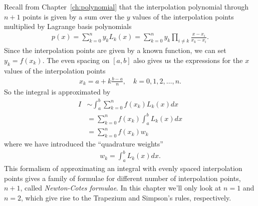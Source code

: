 Recall from Chapter~\ref{ch:polynomial} that the interpolation polynomial through $n+1$ points is given by a sum over the $y$ values of the interpolation points multiplied by Lagrange basis polynomials
\begin{align*}
p(x)  = \sum_{k=0}^n y_k L_k(x) = \sum_{k=0}^n y_k \prod_{i\neq k} \frac{x-x_i}{x_k-x_i}.
\end{align*}
Since the interpolation points are given by a known function, we can set $y_k=f(x_k)$. The even spacing on $[a,b]$ also gives us the expressions for the $x$ values of the interpolation points
\begin{align*}
x_k = a + k\frac{b-a}{n}, \quad k=0,1,2,\dots,n.
\end{align*}
So the integral is approximated by
\begin{align*}
I &\sim \int_a^b \sum_{k=0}^n f(x_k) L_k(x) dx \\
&=  \sum_{k=0}^n f(x_k) \int_a^b L_k(x) dx \\
&=  \sum_{k=0}^n f(x_k) w_k
\end{align*}
where we have introduced the ``quadrature weights''
\begin{align*}
w_k = \int_a^b L_k(x) dx.
\end{align*}
This formalism of approximating an integral with evenly spaced interpolation points gives a family of formulae for different number of interpolation points, $n+1$, called \textit{Newton-Cotes formulae}. In this chapter we'll only look at $n=1$ and $n=2$, which give rise to the Trapezium and Simpson's rules, respectively.

